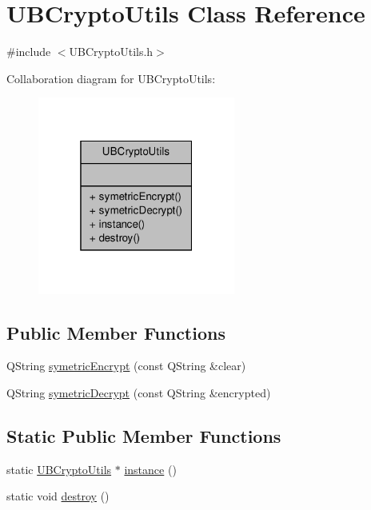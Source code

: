 \hypertarget{class_u_b_crypto_utils}{\section{U\-B\-Crypto\-Utils Class Reference}
\label{dc/d5a/class_u_b_crypto_utils}
}


{\ttfamily \#include $<$U\-B\-Crypto\-Utils.\-h$>$}



Collaboration diagram for U\-B\-Crypto\-Utils\-:
\nopagebreak
\begin{figure}[H]
\begin{center}
\leavevmode
\includegraphics[width=184pt]{d3/d36/class_u_b_crypto_utils__coll__graph}
\end{center}
\end{figure}
\subsection*{Public Member Functions}
\begin{DoxyCompactItemize}
\item 
Q\-String \hyperlink{class_u_b_crypto_utils_a0a214cd089f3e728eb1758df195bbdb3}{symetric\-Encrypt} (const Q\-String \&clear)
\item 
Q\-String \hyperlink{class_u_b_crypto_utils_a618579d64e4f9cf2f7728bb8a2e81208}{symetric\-Decrypt} (const Q\-String \&encrypted)
\end{DoxyCompactItemize}
\subsection*{Static Public Member Functions}
\begin{DoxyCompactItemize}
\item 
static \hyperlink{class_u_b_crypto_utils}{U\-B\-Crypto\-Utils} $\ast$ \hyperlink{class_u_b_crypto_utils_a4c45d0ac631978066fc4df0b6c0f982a}{instance} ()
\item 
static void \hyperlink{class_u_b_crypto_utils_a3e092e4564760c10fd28d0d718f8b9e5}{destroy} ()
\end{DoxyCompactItemize}


